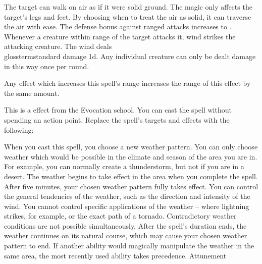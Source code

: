 The target can walk on air as if it were solid ground.
The magic only affects the target's legs and feet.
By choosing when to treat the air as solid, it can traverse the air with ease.
The defense bonus against ranged attacks increases to .
Whenever a creature within \rngclose range of the target attacks it, wind strikes the attacking creature.
The wind deals \\glossterm{standard damage} \minus1d.
Any individual creature can only be dealt damage in this way once per round.
\par Any effect which increases this spell's range increases the range of this effect by the same amount.
\par
This is a  effect from the Evocation school.
You can cast the spell without spending an action point.
Replace the spell's targets and effects with the following:
\begin{spellcontent}
\begin{augmenttargetinginfo}
\end{augmenttargetinginfo}
\begin{augmenteffects}
\spelleffect
When you cast this spell, you choose a new weather pattern.
You can only choose weather which would be possible in the climate and season of the area you are in.
For example, you can normally create a thunderstorm, but not if you are in a desert.
The weather begins to take effect in the area when you complete the spell.
After five minutes, your chosen weather pattern fully takes effect.
You can control the general tendencies of the weather, such as the direction and intensity of the wind.
You cannot control specific applications of the weather -- where lightning strikes, for example, or the exact path of a tornado.
Contradictory weather conditions are not possible simultaneously.
After the spell's duration ends, the weather continues on its natural course, which may cause your chosen weather pattern to end.
If another ability would magically manipulate the weather in the same area, the most recently used ability takes precedence.
\spelldur Attunement
\end{augmenteffects}
\end{spellcontent}
